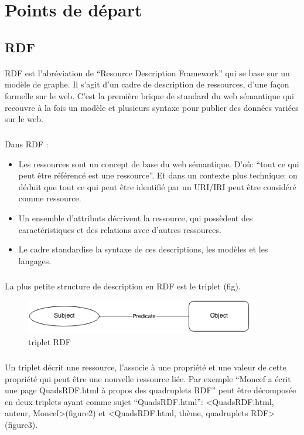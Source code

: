 \section*{Points de départ}
\subsection*{RDF}
\paragraph{}
RDF est l’abréviation de “Resource Description Framework” qui se base sur un modèle de graphe. Il s’agit d’un cadre de description de ressources, d’une façon formelle sur le web.
C’est la première brique de standard du web sémantique qui recouvre à la fois un modèle et plusieurs syntaxe pour publier des données variées sur le web.
\subparagraph{}
Dans RDF : 
\newline 
\begin{itemize}
\item Les ressources sont un concept de base du web sémantique. D’où:  “tout ce qui peut être référencé est une ressource”. Et dans un contexte plus technique: on déduit que tout ce qui peut être identifié par un URI/IRI peut être considéré comme ressource.
\item  Un ensemble d’attributs décrivent la ressource, qui possèdent des caractéristiques et des relations avec d’autres ressources.
\item Le cadre standardise la syntaxe de ces descriptions, les modèles et les langages.  
\end{itemize}
\subparagraph{}
La plus petite structure de description en RDF est le triplet (fig).
\begin{figure}[H]
        \centering
                \centering
                \includegraphics[width=10cm]{tripletrdf.png}
               \caption{triplet RDF}

\end{figure}
\subparagraph{}
Un triplet décrit une ressource, l’associe à une propriété et une valeur de cette propriété qui peut être une nouvelle ressource liée. Par exemple “Moncef a écrit une page QuadsRDF.html à propos des quadruplets RDF” peut être décomposée en deux triplets ayant comme sujet “QuadsRDF.html”:
<QuadsRDF.html, auteur, Moncef>(figure2) et <QuadsRDF.html, thème, quadruplets RDF>(figure3).
